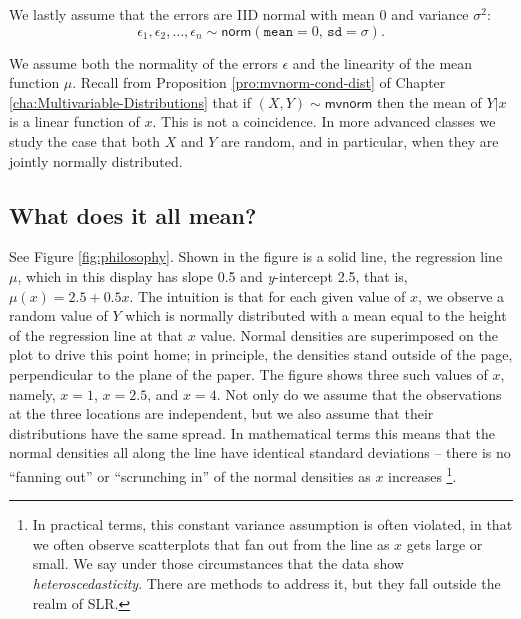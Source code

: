 \documentclass[captions=tableheading]{scrbook}
\begin{document}
\begin{assumption}
We lastly assume that the errors are IID normal with mean 0 and variance \( \sigma^{2} \):
\begin{equation}
\epsilon_{1},\epsilon_{2},\ldots,\epsilon_{n}\sim\mathsf{norm}(\mathtt{mean}=0,\,\mathtt{sd}=\sigma).
\end{equation}
\end{assumption}

\begin{rem}
We assume both the normality of the errors \(\epsilon\) and the linearity of the mean function \( \mu \). Recall from Proposition \ref{pro:mvnorm-cond-dist} of Chapter \ref{cha:Multivariable-Distributions} that if \( (X,Y)\sim\mathsf{mvnorm} \) then the mean of \(Y|x\) is a linear function of \(x\). This is not a coincidence. In more advanced classes we study the case that both \(X\) and \(Y\) are random, and in particular, when they are jointly normally distributed.
\end{rem}
\subsection{What does it all mean?}
\label{sec-11-1-1}

See Figure \ref{fig:philosophy}. Shown in the figure is a solid line, the regression line \(\mu\), which in this display has slope 0.5 and \emph{y}-intercept 2.5, that is, \( \mu(x) = 2.5 + 0.5x \). The intuition is that for each given value of \(x\), we observe a random value of \(Y\) which is normally distributed with a mean equal to the height of the regression line at that \(x\) value. Normal densities are superimposed on the plot to drive this point home; in principle, the densities stand outside of the page, perpendicular to the plane of the paper. The figure shows three such values of \(x\), namely, \( x = 1 \), \( x = 2.5 \), and \( x = 4 \). Not only do we assume that the observations at the three locations are independent, but we also assume that their distributions have the same spread. In mathematical terms this means that the normal densities all along the line have identical standard deviations -- there is no ``fanning out'' or ``scrunching in'' of the normal densities as \(x\) increases
\footnote{In practical terms, this constant variance assumption is often violated, in that we often observe scatterplots that fan out from the line as \(x\) gets large or small. We say under those circumstances that the data show \emph{heteroscedasticity}. There are methods to address it, but they fall outside the realm of SLR.}.
\end{document}
